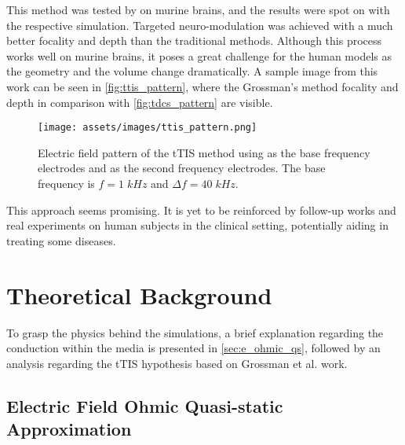 This method was tested by  on murine brains, and the results were spot on with the respective simulation. Targeted neuro-modulation was achieved with a much better focality and depth than the traditional methods. Although this process works well on murine brains, it poses a great challenge for the human models as the geometry and the volume change dramatically. A sample image from this work can be seen in \autoref{fig:ttis_pattern}, where the Grossman's method focality and depth in comparison with \autoref{fig:tdcs_pattern} are visible.

\begin{figure}[H]
    \centering
    \texttt{[image: assets/images/ttis\_pattern.png]}
    \caption{Electric field pattern of the \gls{tTIS} method using  as the base frequency electrodes and  as the second frequency electrodes. The base frequency is $f = 1\; kHz$ and $\Delta f=40\; kHz$.}
    \label{fig:ttis_pattern}
\end{figure}

This approach seems promising. It is yet to be reinforced by follow-up works and real experiments on human subjects in the clinical setting, potentially aiding in treating some diseases.

\section{Theoretical Background}

To grasp the physics behind the simulations, a brief explanation regarding the conduction within the media is presented in \autoref{sec:e_ohmic_qs}, followed by an analysis regarding the \gls{tTIS} hypothesis based on Grossman et al.\cite{Grossman2017} work.

\subsection{Electric Field Ohmic Quasi-static Approximation}
\label{sec:e_ohmic_qs}

